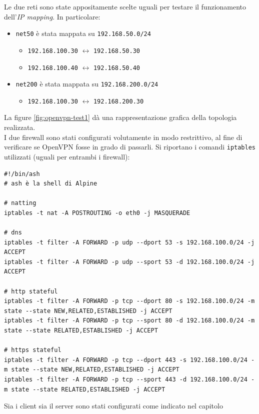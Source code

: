 Le due reti sono state appositamente scelte uguali per testare il funzionamento
dell'\textit{IP mapping}. In particolare:
\begin{itemize}
  \item \texttt{net50} è stata mappata su \texttt{192.168.50.0/24}
  \begin{itemize}
    \item \texttt{192.168.100.30} $\leftrightarrow$ \texttt{192.168.50.30}
    \item \texttt{192.168.100.40} $\leftrightarrow$ \texttt{192.168.50.40}
  \end{itemize}
  \item \texttt{net200} è stata mappata su \texttt{192.168.200.0/24}
  \begin{itemize}
    \item \texttt{192.168.100.30} $\leftrightarrow$ \texttt{192.168.200.30}
  \end{itemize}
\end{itemize}
La figure \ref{fig:openvpn-test1} dà una rappresentazione grafica della topologia
realizzata.\\
I due firewall sono stati configurati volutamente in modo restrittivo, al fine
di verificare se OpenVPN fosse in grado di passarli. Si riportano i comandi
\texttt{iptables} utilizzati (uguali per entrambi i firewall):
\begin{verbatim}
#!/bin/ash
# ash è la shell di Alpine

# natting
iptables -t nat -A POSTROUTING -o eth0 -j MASQUERADE

# dns
iptables -t filter -A FORWARD -p udp --dport 53 -s 192.168.100.0/24 -j ACCEPT
iptables -t filter -A FORWARD -p udp --sport 53 -d 192.168.100.0/24 -j ACCEPT

# http stateful
iptables -t filter -A FORWARD -p tcp --dport 80 -s 192.168.100.0/24 -m state --state NEW,RELATED,ESTABLISHED -j ACCEPT
iptables -t filter -A FORWARD -p tcp --sport 80 -d 192.168.100.0/24 -m state --state RELATED,ESTABLISHED -j ACCEPT

# https stateful
iptables -t filter -A FORWARD -p tcp --dport 443 -s 192.168.100.0/24 -m state --state NEW,RELATED,ESTABLISHED -j ACCEPT
iptables -t filter -A FORWARD -p tcp --sport 443 -d 192.168.100.0/24 -m state --state RELATED,ESTABLISHED -j ACCEPT
\end{verbatim}
Sia i client sia il server sono stati configurati come indicato nel capitolo
